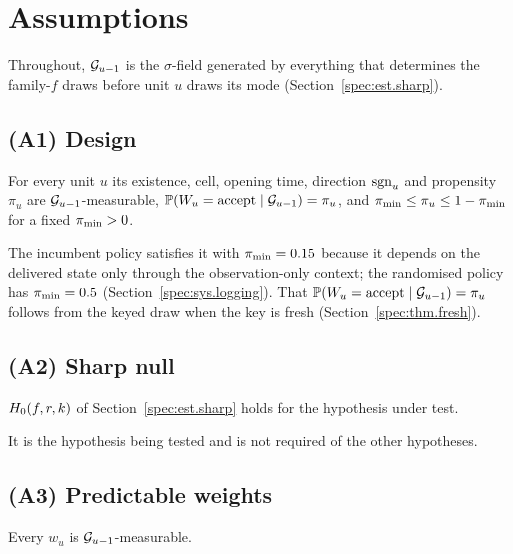 \section{Assumptions}
\label{spec:asm}

Throughout, $\mathcal{G}_{u-1}$ is the $\sigma$-field generated by everything that determines the family-$f$ draws before unit $u$ draws its mode (Section~\ref{spec:est.sharp}).

\subsection{(A1) Design}
\label{spec:asm.a1}

\begin{assumption}[Design]
For every unit $u$ its existence, cell, opening time, direction $\mathrm{sgn}_u$ and propensity $\pi_u$ are $\mathcal{G}_{u-1}$-measurable, $\mathbb{P}(W_u = \text{accept} \mid \mathcal{G}_{u-1}) = \pi_u$, and $\pi_{\min} \le \pi_u \le 1 - \pi_{\min}$ for a fixed $\pi_{\min} > 0$.
\end{assumption}

\noindent The incumbent policy satisfies it with $\pi_{\min} = 0.15$ because it depends on the delivered state only through the observation-only context; the randomised policy has $\pi_{\min} = 0.5$ (Section~\ref{spec:sys.logging}). That $\mathbb{P}(W_u = \text{accept} \mid \mathcal{G}_{u-1}) = \pi_u$ follows from the keyed draw when the key is fresh (Section~\ref{spec:thm.fresh}).


\subsection{(A2) Sharp null}
\label{spec:asm.a2}

\begin{assumption}
$H_0(f, r, k)$ of Section~\ref{spec:est.sharp} holds for the hypothesis under test.
\end{assumption}

\noindent It is the hypothesis being tested and is not required of the other hypotheses.

\subsection{(A3) Predictable weights}
\label{spec:asm.a3}

\begin{assumption}
Every $w_u$ is $\mathcal{G}_{u-1}$-measurable.
\end{assumption}

